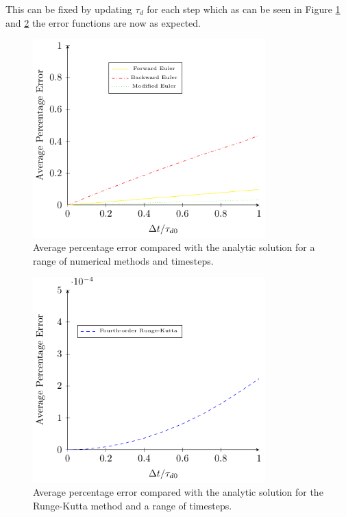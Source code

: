 \documentclass[../Interim_Report_Master]{subfiles}
\begin{document}
This can be fixed by updating $\tau_d$ for each step which as can be seen in Figure \ref{uc_d2_convergence_2} and \ref{uc_d2_convergence_3} the error functions are now as expected.

\begin{figure}[H]
	\centering
	\includegraphics[width=0.8\textwidth]{./Diagrams/Uncoupled_D2_Convergence_2/Uncoupled_D2_Convergence_2.pdf}
	\caption{Average percentage error compared with the analytic solution for a range of numerical methods and timesteps.}
	\label{uc_d2_convergence_2}
\end{figure}

\begin{figure}[H]
	\centering
	\includegraphics[width=0.8\textwidth]{./Diagrams/Uncoupled_D2_Convergence_2/Uncoupled_D2_Convergence_3.pdf}
	\caption{Average percentage error compared with the analytic solution for the Runge-Kutta method and a range of timesteps.}
	\label{uc_d2_convergence_3}
\end{figure}
\end{document}
